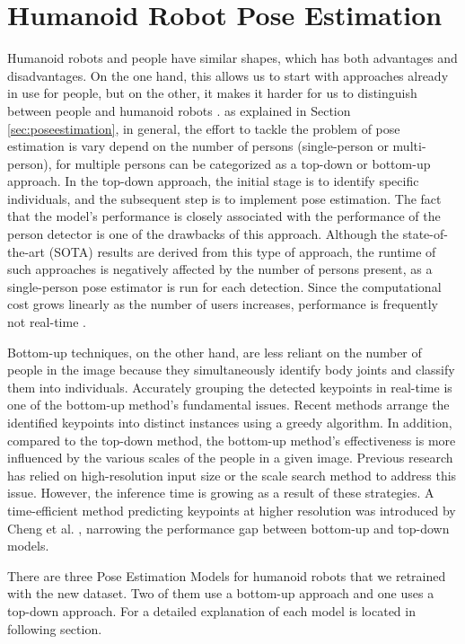 \section{Humanoid Robot Pose Estimation}
\label{sec:humanoidrobotposeestimation}

Humanoid robots and people have similar shapes, which has both advantages and disadvantages. On the one hand, this allows us to start with approaches already in use for people, but on the other, it makes it harder for us to distinguish between people and humanoid robots \parencite{amini2021}.
as explained in Section \ref{sec:poseestimation}, in general, the effort to tackle the problem of pose estimation is vary depend on the number of persons (single-person or multi-person), for multiple persons can be categorized as a top-down or bottom-up approach.
In the top-down approach, the initial stage is to identify specific individuals, and the subsequent step is to implement pose estimation. The fact that the model's performance is closely associated with the performance of the person detector is one of the drawbacks of this approach. Although the state-of-the-art (SOTA) results are derived from this type of approach,  the runtime of such approaches is negatively affected by the number of persons present,
as a single-person pose estimator is run for each detection. Since the computational cost grows linearly as the number of users increases, performance is frequently not real-time \parencite{amini2021}.

Bottom-up techniques, on the other hand, are less reliant on the number of people in the image because they simultaneously identify body joints and classify them into individuals. Accurately grouping the detected keypoints in real-time is one of the bottom-up method's fundamental issues.
Recent methods arrange the identified keypoints into distinct instances using a greedy algorithm. In addition, compared to the top-down method, the bottom-up method's effectiveness is more influenced by the various scales of the people in a given image. Previous research has relied on high-resolution input size \parencite{papandreou2018} or the scale search method \parencite{cao2019} to address this issue. However, the inference time is growing as a result of these strategies.
A time-efficient method predicting keypoints at higher resolution was introduced by Cheng et al. \parencite{cheng2020}, narrowing the performance gap between bottom-up and top-down models.

There are three Pose Estimation Models for humanoid robots that we retrained with the
new dataset. Two of them use a bottom-up approach and one uses a top-down approach. For a detailed explanation of each model is located in following section.

